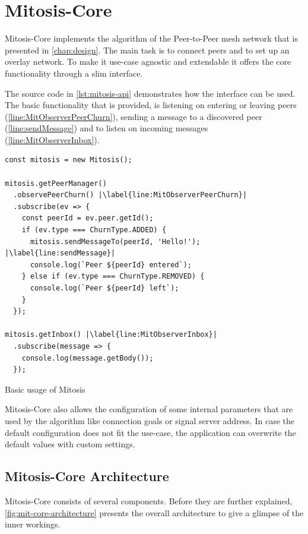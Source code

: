 \section{Mitosis-Core}
Mitosis-Core implements the algorithm of the Peer-to-Peer mesh network that is presented in \vref{chap:design}. The main task is to connect peers and to set up an overlay network. To make it use-case agnostic and extendable it offers the core functionality through a slim interface.

The source code in \vref{lst:mitosis-api} demonstrates how the interface can be used.
The basic functionality that is provided, is listening on entering or leaving peers (\cref{line:MitObserverPeerChurn}), sending a message to a discovered peer (\cref{line:sendMessage}) and to listen on incoming messages (\cref{line:MitObserverInbox}).

\begin{Listing}[htb!]
\begin{lstlisting}[basicstyle=\tiny,basicstyle=\footnotesize\ttfamily,xleftmargin=3em]
const mitosis = new Mitosis();

mitosis.getPeerManager()
  .observePeerChurn() |\label{line:MitObserverPeerChurn}|
  .subscribe(ev => {
    const peerId = ev.peer.getId();
    if (ev.type === ChurnType.ADDED) {
      mitosis.sendMessageTo(peerId, 'Hello!'); |\label{line:sendMessage}|
      console.log(`Peer ${peerId} entered`);
    } else if (ev.type === ChurnType.REMOVED) {
      console.log(`Peer ${peerId} left`);
    }
  });
  
mitosis.getInbox() |\label{line:MitObserverInbox}|
  .subscribe(message => {
    console.log(message.getBody());
  });
\end{lstlisting}
\caption{Basic usage of Mitosis}
\label{lst:mitosis-api}
\end{Listing}

Mitosis-Core also allows the configuration of some internal parameters that are used by the algorithm like connection goals or signal server address. In case the default configuration does not fit the use-case, the application can overwrite the default values with custom settings.

\subsection{Mitosis-Core Architecture}
Mitosis-Core consists of several components. Before they are further explained, \vref{fig:mit-core-architecture} presents the overall architecture to give a glimpse of the inner workings.

